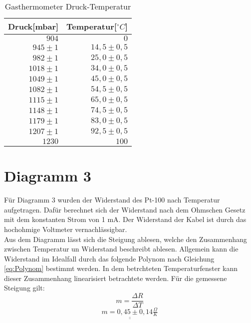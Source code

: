 \begin{table}[h!]
    \centering
    \caption{Gasthermometer Druck-Temperatur}
    \begin{tabular}{r r}
        \toprule
        Druck[mbar] & Temperatur[$^\circ C$]\\
        \midrule
        $904$ & $0$ \\
        $945 \pm 1$ & $14,5 \pm 0,5$ \\
        $982\pm 1$  & $25,0 \pm 0,5 $ \\
        $1018\pm 1$ & $34,0 \pm 0,5 $ \\
        $1049\pm 1$ & $45,0 \pm 0,5$ \\
        $1082\pm 1$ & $54,5 \pm 0,5 $ \\
        $1115\pm 1$ & $65,0 \pm 0,5 $  \\
        $1148\pm 1$ & $74,5 \pm 0,5 $ \\
        $1179\pm 1$ & $83,0 \pm 0,5$ \\
        $1207\pm 1$ & $92,5 \pm 0,5$ \\
        $1230$ & $100$ \\
        \bottomrule


        
    \end{tabular}
\end{table}
\clearpage
\newpage
\clearpage
\newpage

\section{Diagramm 3}
Für Diagramm 3 wurden der Widerstand des Pt-100 nach Temperatur aufgetragen.
Dafür berechnet sich der Widerstand nach dem Ohmschen Gesetz mit dem konstanten Strom von 1 mA.
Der Widerstand der Kabel ist durch das hochohmige Voltmeter vernachlässigbar.\\

Aus dem Diagramm lässt sich die Steigung ablesen, welche den Zusammenhang zwischen Temperatur un Widerstand beschreibt ablesen.
Allgemein kann die Widerstand im Idealfall durch das folgende Polynom nach Gleichung \ref{eq:Polynom} bestimmt werden.
In dem betrchteten Temperaturfenster kann dieser Zusammenhang linearisiert betrachtete werden.
Für die gemessene Steigung gilt:
\begin{equation}
    m = \frac{\Delta R}{\Delta T}
\end{equation}
\[\underline{\underline{m = 0,45 \pm 0,14 \tfrac{\Omega}{K}}}\]

